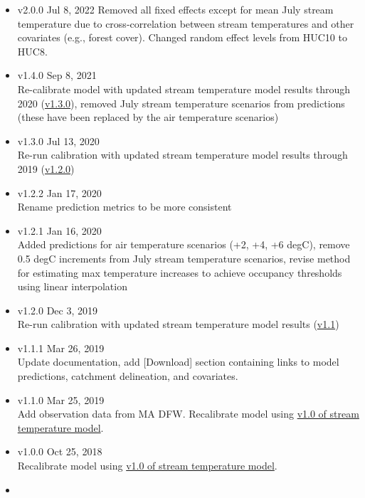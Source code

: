 \documentclass[
]{book}
\providecommand{\tightlist}{%
  \setlength{\itemsep}{0pt}\setlength{\parskip}{0pt}}
\begin{document}
\begin{itemize}
\tightlist
\item
  v2.0.0 \textbar{} Jul 8, 2022
  Removed all fixed effects except for mean July stream temperature due to cross-correlation between stream temperatures and other covariates (e.g., forest cover). Changed random effect levels from HUC10 to HUC8.
\item
  v1.4.0 \textbar{} Sep 8, 2021\\
  Re-calibrate model with updated stream temperature model results through 2020 (\href{http://ecosheds.org/models/stream-temperature/v1.3.0/}{v1.3.0}), removed July stream temperature scenarios from predictions (these have been replaced by the air temperature scenarios)
\item
  v1.3.0 \textbar{} Jul 13, 2020\\
  Re-run calibration with updated stream temperature model results through 2019 (\href{http://ecosheds.org/models/stream-temperature/v1.2.0/}{v1.2.0})
\item
  v1.2.2 \textbar{} Jan 17, 2020\\
  Rename prediction metrics to be more consistent
\item
  v1.2.1 \textbar{} Jan 16, 2020\\
  Added predictions for air temperature scenarios (+2, +4, +6 degC), remove 0.5 degC increments from July stream temperature scenarios, revise method for estimating max temperature increases to achieve occupancy thresholds using linear interpolation
\item
  v1.2.0 \textbar{} Dec 3, 2019\\
  Re-run calibration with updated stream temperature model results (\href{http://ecosheds.org/models/stream-temperature/v1.1/}{v1.1})
\item
  v1.1.1 \textbar{} Mar 26, 2019\\
  Update documentation, add {[}Download{]} section containing links to model predictions, catchment delineation, and covariates.
\item
  v1.1.0 \textbar{} Mar 25, 2019\\
  Add observation data from MA DFW. Recalibrate model using \href{http://ecosheds.org/models/stream-temperature/v1.0.1/}{v1.0 of stream temperature model}.
\item
  v1.0.0 \textbar{} Oct 25, 2018\\
  Recalibrate model using \href{http://ecosheds.org/models/stream-temperature/v1.0.1/}{v1.0 of stream temperature model}.
\item

\end{itemize}
\end{document}
